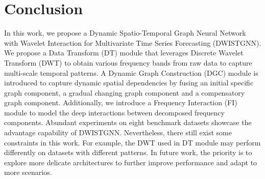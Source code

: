 \documentclass[final,12pt]{elsarticle}
\begin{document}
\section{Conclusion}
\label{sec-6}


In this work, we propose a 
Dynamic Spatio-Temporal Graph Neural Network with Wavelet Interaction 
for Multivariate Time Series Forecasting (DWISTGNN).
We propose a Data Transform (DT) module 
that leverages Discrete Wavelet Transform (DWT) 
to obtain various frequency bands from raw data 
to capture multi-scale temporal patterns.
A Dynamic Graph Construction (DGC) module is introduced 
to capture dynamic spatial dependencies 
by fusing an initial specific graph component, 
a gradual changing graph component and a compensatory graph component.
Additionally, we introduce a Frequency Interaction (FI) module 
to model the deep interactions between decomposed frequency components.
Abundant experiments on eight benchmark datasets 
showcase the advantage capability of DWISTGNN.
Nevertheless, there still exist some constraints in this work.
For example, the DWT used in DT module 
may perform differently on datasets with different patterns.
In future work, the priority is to explore more delicate architectures 
to further improve performance and adapt to more scenarios.







\end{document}
